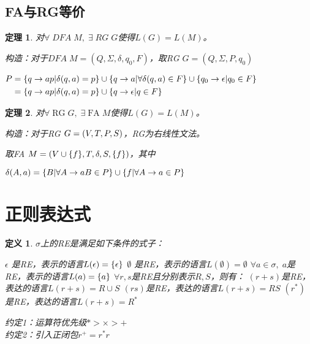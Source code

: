 \documentclass[twocolumn,zihao=5,linespread=1,heading=false,autoindent=0pt]{ctexart}
\DeclarePairedDelimiter{\set}{\{}{\}}
\DeclarePairedDelimiter{\paren}{(}{)}
\theoremstyle{exampstyle} \newtheorem{definition}{定义}[section]
\theoremstyle{exampstyle} \newtheorem{example}{例}[section]
\theoremstyle{exampstyle} \newtheorem{theorem}{定理}[section]
\theoremstyle{exampstyle} \newtheorem{lemma}{引理}[section]
\theoremstyle{exampstyle} \newtheorem{myproof}{证明}[section]
\begin{document}
\subsection{FA与RG等价}

\begin{theorem}
    对$\forall\;DFA\;M,\;\exists\;RG\;G$使得$L(G) = L(M)$。

    构造：对于$DFA\; M=(Q,\Sigma,\delta,q_0, F)$，取RG
    $G=(Q, \Sigma, P, q_0)$

    $\begin{aligned}
        P &= \set*{q \to ap | \delta(q, a) = p} \cup 
    \set*{q \to a | \forall \delta(q, a) \in F} \cup
    \set*{q_0 \to \epsilon | q_0 \in F} \\
        & = \set*{q \to ap | \delta(q, a) = p} \cup 
        \set*{q \to \epsilon | q \in F} \\
    \end{aligned}$
\end{theorem}

\begin{theorem}
    对$\forall\;\text{RG}\;G,\;\exists\; \text{FA} \;M$使得$L(G) = L(M)$。

    构造：对于RG $G=\paren*{V, T, P, S}$，RG为右线性文法。

    取FA $M=(V \cup \set*{f},T,\delta,S, \set*{f})$，其中

    $\delta(A, a) = \set*{B | \forall A \to aB \in P} \cup 
    \set*{f | \forall A \to a \in P} 
    $
\end{theorem}

\section{正则表达式}

\begin{definition}
    $\sigma$上的RE是满足如下条件的式子：
    \begin{outline}[citemize]
        \1 $\epsilon$ 是RE，表示的语言$L(\epsilon) = \set*{\epsilon}$
        \1 $\emptyset$ 是RE，表示的语言$L(\emptyset) = \emptyset$
        \1 $\forall a \in \sigma,\; a$是RE，表示的语言$L(a) = \set{a}$
        \1 $\forall r, s$是RE且分别表示$R,S$，则有：
            \2 $(r+s)$是RE，表达的语言$L(r+s) = R \cup S$
            \2 $(rs)$是RE，表达的语言$L(r+s) = RS$
            \2 $(r^*)$是RE，表达的语言$L(r+s) = R^*$
    \end{outline}
    约定1：运算符优先级$* > \times > +$ \\
    约定2：引入正闭包$r^+ = r^*r$
\end{definition}
\end{document}
